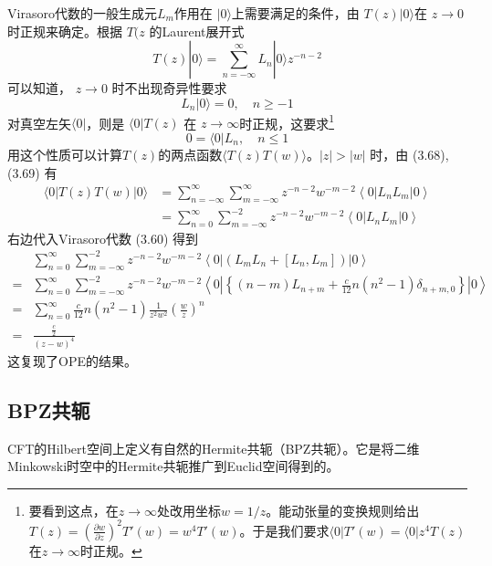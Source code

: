 Virasoro代数的一般生成元$ L_m $作用在 $|0\rangle $上需要满足的条件，由 $T(z)|0\rangle $在 $z\to 0 $时正规来确定。根据 $T(z$ 的Laurent展开式
\begin{equation}
	T(z)|0\rangle=\sum_{n=-\infty}^{\infty} L_{n}|0\rangle z^{-n-2}
\end{equation}
可以知道， $z\to 0$ 时不出现奇异性要求
\begin{equation}
	L_{n}|0\rangle=0, \quad n \geq-1
\end{equation}
对真空左矢$ \langle 0| $，则是 $\langle 0|T(z)$ 在 $z\to \infty $时正规，这要求\footnote{要看到这点，在$z \to \infty$处改用坐标$w = 1/z$。能动张量的变换规则给出$T(z) = \left( \frac{\partial w}{\partial z} \right)^2 T'(w)=w^4 T'(w)$。于是我们要求$\langle 0 | T'(w) = \langle 0 | z^4 T(z)$在$z \to \infty$时正规。}
\begin{equation}
	0=\langle 0| L_{n}, \quad n \leq 1
\end{equation}
用这个性质可以计算$ T(z) $的两点函数$ \langle T(z)T(w)\rangle $。$ |z|>|w|$ 时，由 (3.68),(3.69) 有
\begin{equation*}
	\begin{aligned} \langle 0|T(z) T(w)| 0\rangle &=\sum_{n=-\infty}^{\infty} \sum_{m=-\infty}^{\infty} z^{-n-2} w^{-m-2}\left\langle 0\left|L_{n} L_{m}\right| 0\right\rangle \\ &=\sum_{n=0}^{\infty} \sum_{m=-\infty}^{-2} z^{-n-2} w^{-m-2}\left\langle 0\left|L_{n} L_{m}\right| 0\right\rangle \end{aligned}
\end{equation*}
右边代入Virasoro代数 (3.60) 得到
\begin{equation*}
\begin{aligned} & \sum_{n=0}^{\infty} \sum_{m=-\infty}^{-2} z^{-n-2} w^{-m-2}\left\langle 0\left|\left(L_{m} L_{n}+\left[L_{n}, L_{m}\right]\right)\right| 0\right\rangle \\ =& \sum_{n=0}^{\infty} \sum_{m=-\infty}^{-2} z^{-n-2} w^{-m-2}\left\langle 0\left|\left\{(n-m) L_{n+m}+\frac{c}{12} n\left(n^{2}-1\right) \delta_{n+m, 0}\right\}\right| 0\right\rangle \\ =& \sum_{n=0}^{\infty} \frac{c}{12} n\left(n^{2}-1\right) \frac{1}{z^{2} w^{2}}\left(\frac{w}{z}\right)^{n} \\ =& \frac{\frac{c}{2}}{(z-w)^{4}} \end{aligned}
\end{equation*}
这复现了OPE的结果。

\subsection{BPZ共轭}
CFT的Hilbert空间上定义有自然的Hermite共轭（BPZ共轭）。它是将二维Minkowski时空中的Hermite共轭推广到Euclid空间得到的。

